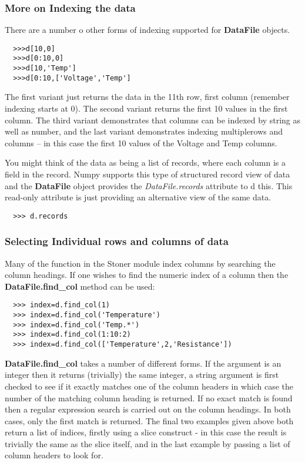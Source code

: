 \documentclass[a4paper,11pt]{scrartcl}
\begin{document}
\subsubsection{More on Indexing the data}

There are a number o other forms of indexing supported for \textbf{DataFile}
objects.

\begin{verbatim}
  >>>d[10,0]
  >>>d[0:10,0]
  >>>d[10,'Temp']
  >>>d[0:10,['Voltage','Temp']
\end{verbatim}

The first variant just returns the data in the 11th row, first column (remember
indexing starts at 0). The second variant returns the first 10 values in the
first column. The third variant demonstrates that columns can be indexed by
string as well as number, and the last variant demonstrates indexing
multiplerows and columns -- in this case the first 10 values of the Voltage and
Temp columns.

You might think of the data as being a list of records, where each column is a
field in the record. Numpy supports this type of structured record view of data
and the \textbf{DataFile} object provides the \textit{DataFile.records}
attribute to d this. This read-only attribute is just providing an alternative
view of the same data.

\begin{verbatim}
  >>> d.records
\end{verbatim}

\subsubsection{Selecting Individual rows and columns of data}

Many of the function in the Stoner module index columns by searching the column
headings. If one wishes to find the numeric index of a column then the
\textbf{DataFile.find\_col} method can be used:

\begin{verbatim}
  >>> index=d.find_col(1)
  >>> index=d.find_col('Temperature')
  >>> index=d.find_col('Temp.*')
  >>> index=d.find_col(1:10:2)
  >>> index=d.find_col(['Temperature',2,'Resistance'])
\end{verbatim}

 \textbf{DataFile.find\_col} takes a number of different forms. If the argument
is an integer then it returns (trivially) the same integer, a string argument is
first checked to see if it exactly matches one of the column headers in which
case the number of the matching column heading is returned. If no exact match is
found then a regular expression search is carried out on the column headings. In
both cases, only the first match is returned. The final two examples given above
both return a list of indices, firstly using a slice construct - in this case
the result is trivially the same as the slice itself, and in the last example by
passing a list of column headers to look for.
\end{document}

